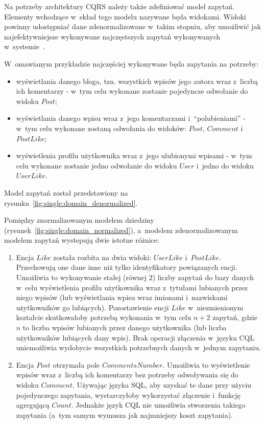



Na potrzeby architektury CQRS należy także zdefiniować model zapytań.
Elementy wchodzące w~skład tego modelu nazywane będa widokami.
Widoki powinny udostępniać dane zdenormalizowane w~takim stopniu, aby umożliwić jak najefektywniejsze wykonywane najczęstszych zapytań wykonywanych w~systemie~\cite{cassandra_model}.

W~omawianym przykładzie najczęściej wykonywane będa zapytania na potrzeby:

\begin{itemize}
 \item wyświetlania danego bloga, tzn. wszystkich wpisów jego autora wraz z~liczbą ich komentarzy - w~tym celu wykonane zostanie pojedyncze odwołanie do widoku $Post$;
 \item wyświetlania danego wpisu wraz z~jego komentarzami i~``polubieniami'' - w~tym celu wykonane zostaną odwołania do widoków: $Post$, $Comment$ i~$PostLike$;
 \item wyświetlenia profilu użytkownika wraz z~jego ulubionymi wpisami - w~tym celu wykonane zostanie jedno odwołanie do widoku $User$ i~jedno do widoku $UserLike$.
\end{itemize}

Model zapytań został przedstawiony na rysunku~\ref{fig:single:domain_denormalized}.



Pomiędzy znormalizowanym modelem dziedziny (rysunek~\ref{fig:single:domain_normalized}), a~modelem zdenormalizowanym modelem zapytań wystepują dwie istotne różnice:

\begin{enumerate}
 \item Encja $Like$ została rozbita na dwia widoki: $UserLike$ i~$PostLike$.
 Przechowują one dane inne niż tylko identyfikatory powiązanych encji.
 Umożliwia to wykonywanie stałej (równej $2$) liczby zapytań do bazy danych w~celu wyświetlenia profilu użytkownika wraz z~tytułami lubianych przez niego wpisów (lub wyświetlania wpisu wraz imionami i~nazwiskami użytkowników go lubiących).
 Pozostawienie encji $Like$ w~niezmienionym kształcie skutkowałoby potrzebą wykonania w~tym celu $n + 2$ zapytań, gdzie $n$ to liczba wpisów lubianych przez danego użytkownika (lub liczba użytkowników lubiących dany wpis).
 Brak operacji złączenia w~języku CQL uniemożliwia wydobycie wszystkich potrzebnych danych w~jednym zapytaniu.
 \item Encja $Post$ otrzymała pole $CommentsNumber$.
 Umożliwia to wyświetlenie wpisów wraz z~liczbą ich komentarzy bez potrzeby odwoływania się do widoku $Comment$.
 Używając języka SQL, aby uzyskać te dane przy użyciu pojedynczego zapytania, wystarczyłoby wykorzystać złączenie i~funkcję agregującą $Count$.
 Jednakże język CQL nie umożliwia stworzenia takiego zapytania (a~tym samym wymusza jak najmniejszy koszt zapytania).
\end{enumerate}



